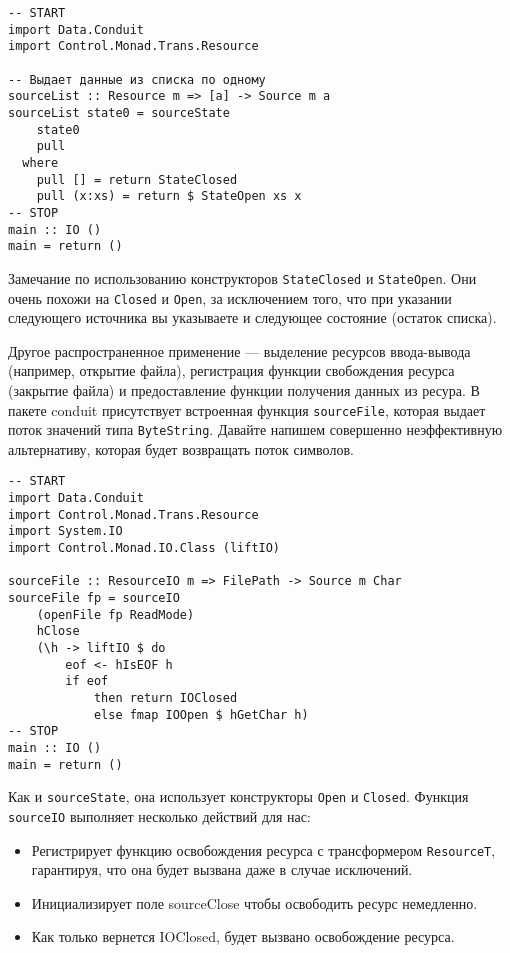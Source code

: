 \begin{lstlisting}
-- START
import Data.Conduit
import Control.Monad.Trans.Resource

-- Выдает данные из списка по одному
sourceList :: Resource m => [a] -> Source m a
sourceList state0 = sourceState
    state0
    pull
  where
    pull [] = return StateClosed
    pull (x:xs) = return $ StateOpen xs x
-- STOP
main :: IO ()
main = return ()
\end{lstlisting}

Замечание по использованию конструкторов \lstinline=StateClosed= и \lstinline=StateOpen=.
Они очень похожи на
\lstinline=Closed= и \lstinline=Open=, за исключением того, что при указании следующего
источника вы указываете и следующее состояние (остаток списка).

Другое распространенное применение --- выделение ресурсов ввода-вывода (например,
открытие файла), регистрация функции свобождения ресурса (закрытие файла) и
предоставление функции получения данных из ресура.
В пакете conduit присутствует встроенная функция \verb=sourceFile=, которая выдает поток
значений типа \lstinline=ByteString=. Давайте напишем совершенно неэффективную
альтернативу, которая будет возвращать поток символов.

\begin{lstlisting}
-- START
import Data.Conduit
import Control.Monad.Trans.Resource
import System.IO
import Control.Monad.IO.Class (liftIO)

sourceFile :: ResourceIO m => FilePath -> Source m Char
sourceFile fp = sourceIO
    (openFile fp ReadMode)
    hClose
    (\h -> liftIO $ do
        eof <- hIsEOF h
        if eof
            then return IOClosed
            else fmap IOOpen $ hGetChar h)
-- STOP
main :: IO ()
main = return ()
\end{lstlisting}

Как и \verb=sourceState=, она использует конструкторы \verb*|Open| и \verb*|Closed|.
Функция \lstinline=sourceIO= выполняет несколько действий  для нас:
\begin{itemize}
 \item Регистрирует функцию освобождения ресурса с трансформером \lstinline=ResourceT=,
гарантируя, что она будет вызвана даже в случае исключений.
 \item Инициализирует поле sourceClose чтобы освободить ресурс немедленно.
 \item Как только вернется IOClosed, будет вызвано освобождение ресурса.
\end{itemize}
  
